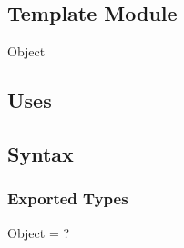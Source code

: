 \documentclass[12pt, titlepage]{article}
\begin{document}
\subsection{Template Module}
Object

\subsection{Uses}

\subsection{Syntax}
\subsubsection{Exported Types}
Object = ?
\end{document}
